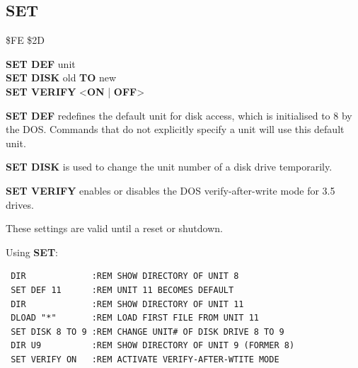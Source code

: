 
\newpage
\subsection{SET}
\begin{description}[leftmargin=2cm,style=nextline]
\item [Token:] \$FE \$2D
\item [Format:] {\bf SET DEF} unit \\
                {\bf SET DISK} old {\bf TO} new \\
                {\bf SET VERIFY} <{\bf ON} | {\bf OFF}>
\item [Usage:]  {\bf SET DEF} redefines the default unit
                for disk access, which is initialised to 8 by
                the DOS. Commands that do not explicitly
                specify a unit will use this default unit.

                {\bf SET DISK} is used to change
                the unit number of a disk drive temporarily.

                {\bf SET VERIFY} enables or disables
                the DOS verify-after-write mode for
                3.5 drives.

\item [Remarks:] These settings are valid until a reset
                 or shutdown.

\item [Examples:] Using {\bf SET}:
\begin{tcolorbox}[colback=black,coltext=white]
\verbatimfont{\codefont}
\begin{verbatim}
 DIR             :REM SHOW DIRECTORY OF UNIT 8
 SET DEF 11      :REM UNIT 11 BECOMES DEFAULT
 DIR             :REM SHOW DIRECTORY OF UNIT 11
 DLOAD "*"       :REM LOAD FIRST FILE FROM UNIT 11
 SET DISK 8 TO 9 :REM CHANGE UNIT# OF DISK DRIVE 8 TO 9
 DIR U9          :REM SHOW DIRECTORY OF UNIT 9 (FORMER 8)
 SET VERIFY ON   :REM ACTIVATE VERIFY-AFTER-WTITE MODE
\end{verbatim}
\end{tcolorbox}
\end{description}


\newpage
